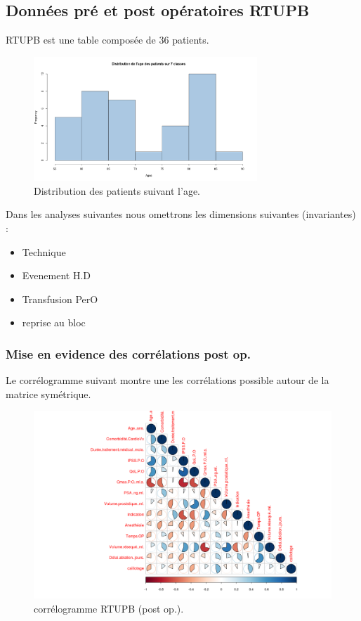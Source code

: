 %
%
\subsection{Données pré et post opératoires RTUPB}

RTUPB est une table composée de 36 patients. 
	
\begin{figure}[!h]
\centering
\includegraphics[width=0.75\textwidth]{../Fig/RTUPB/rtupb-age-frequency.png}
\caption{Distribution des patients suivant l'age.}
\end{figure}

Dans les analyses suivantes nous omettrons les dimensions suivantes  (invariantes)  :  

\begin{itemize}
\item Technique
\item Evenement H.D
\item Transfusion PerO
\item reprise au bloc 
\end{itemize}


\subsubsection{Mise en evidence des corrélations post op.}

Le corrélogramme suivant montre une les corrélations possible autour de la matrice symétrique.

\begin{figure}[!h]
\centering
\includegraphics[width=1\textwidth]{../Fig/RTUPB/rtupb-matrice-cor-graph.png}
\caption{corrélogramme RTUPB (post op.).}
\end{figure}

